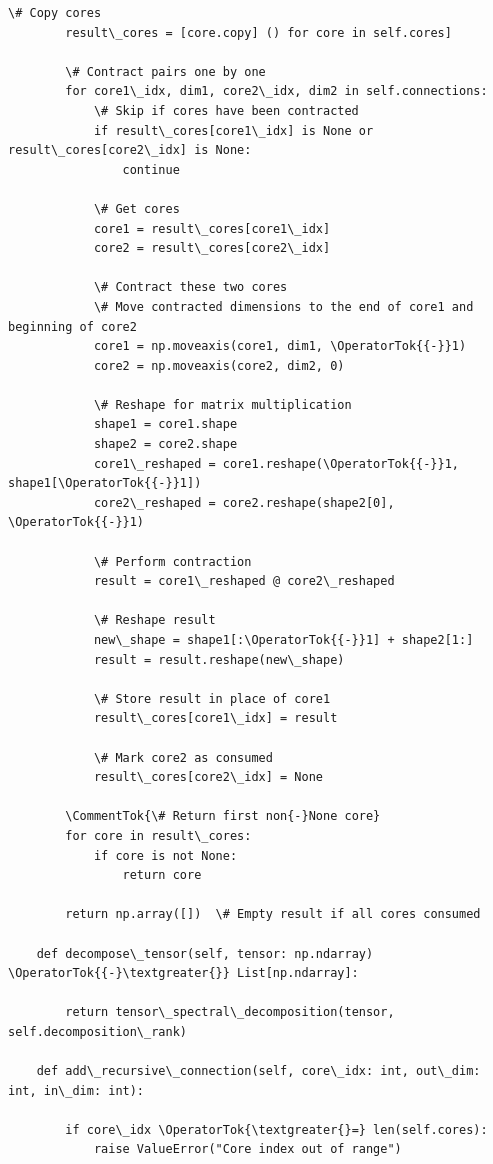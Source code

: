 \documentclass[12pt]{article}
\begin{document}
\begin{lstlisting}[basicstyle=\ttfamily\small]
        \# Copy cores
        result\_cores = [core.copy] () for core in self.cores]
        
        \# Contract pairs one by one
        for core1\_idx, dim1, core2\_idx, dim2 in self.connections:
            \# Skip if cores have been contracted
            if result\_cores[core1\_idx] is None or result\_cores[core2\_idx] is None:
                continue
            
            \# Get cores
            core1 = result\_cores[core1\_idx]
            core2 = result\_cores[core2\_idx]
            
            \# Contract these two cores
            \# Move contracted dimensions to the end of core1 and beginning of core2
            core1 = np.moveaxis(core1, dim1, \OperatorTok{{-}}1)
            core2 = np.moveaxis(core2, dim2, 0)
            
            \# Reshape for matrix multiplication
            shape1 = core1.shape
            shape2 = core2.shape
            core1\_reshaped = core1.reshape(\OperatorTok{{-}}1, shape1[\OperatorTok{{-}}1])
            core2\_reshaped = core2.reshape(shape2[0], \OperatorTok{{-}}1)
            
            \# Perform contraction
            result = core1\_reshaped @ core2\_reshaped
            
            \# Reshape result
            new\_shape = shape1[:\OperatorTok{{-}}1] + shape2[1:]
            result = result.reshape(new\_shape)
            
            \# Store result in place of core1
            result\_cores[core1\_idx] = result
            
            \# Mark core2 as consumed
            result\_cores[core2\_idx] = None
        
        \CommentTok{\# Return first non{-}None core}
        for core in result\_cores:
            if core is not None:
                return core
        
        return np.array([])  \# Empty result if all cores consumed
    
    def decompose\_tensor(self, tensor: np.ndarray) \OperatorTok{{-}\textgreater{}} List[np.ndarray]:

        return tensor\_spectral\_decomposition(tensor, self.decomposition\_rank)
    
    def add\_recursive\_connection(self, core\_idx: int, out\_dim: int, in\_dim: int):

        if core\_idx \OperatorTok{\textgreater{}=} len(self.cores):
            raise ValueError("Core index out of range")
        

\end{lstlisting}
\end{document}
